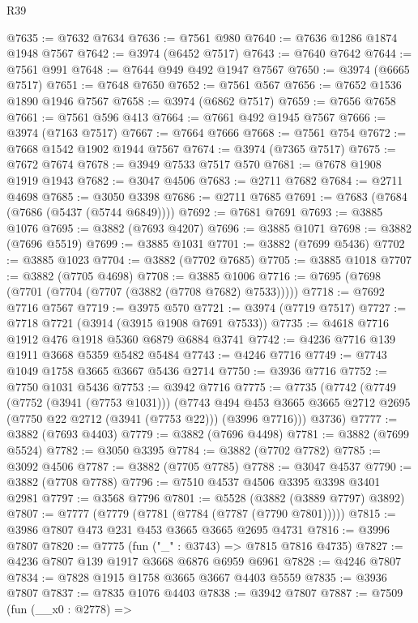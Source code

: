 \begin{lexlean}{R39}
\begin{coremodule}
@7635 := @7632 @7634
@7636 := @7561 @980
@7640 := @7636 @1286 @1874 @1948 @7567
@7642 := @3974 (@6452 @7517)
@7643 := @7640 @7642
@7644 := @7561 @991
@7648 := @7644 @949 @492 @1947 @7567
@7650 := @3974 (@6665 @7517)
@7651 := @7648 @7650
@7652 := @7561 @567
@7656 := @7652 @1536 @1890 @1946 @7567
@7658 := @3974 (@6862 @7517)
@7659 := @7656 @7658
@7661 := @7561 @596 @413
@7664 := @7661 @492 @1945 @7567
@7666 := @3974 (@7163 @7517)
@7667 := @7664 @7666
@7668 := @7561 @754
@7672 := @7668 @1542 @1902 @1944 @7567
@7674 := @3974 (@7365 @7517)
@7675 := @7672 @7674
@7678 := @3949 @7533 @7517 @570
@7681 := @7678 @1908 @1919 @1943
@7682 := @3047 @4506
@7683 := @2711 @7682
@7684 := @2711 @4698
@7685 := @3050 @3398
@7686 := @2711 @7685
@7691 := @7683 (@7684 (@7686 (@5437 (@5744 @6849))))
@7692 := @7681 @7691
@7693 := @3885 @1076
@7695 := @3882 (@7693 @4207)
@7696 := @3885 @1071
@7698 := @3882 (@7696 @5519)
@7699 := @3885 @1031
@7701 := @3882 (@7699 @5436)
@7702 := @3885 @1023
@7704 := @3882 (@7702 @7685)
@7705 := @3885 @1018
@7707 := @3882 (@7705 @4698)
@7708 := @3885 @1006
@7716 := @7695 (@7698 (@7701 (@7704 (@7707 (@3882 (@7708 @7682) @7533)))))
@7718 := @7692 @7716 @7567
@7719 := @3975 @570
@7721 := @3974 (@7719 @7517)
@7727 := @7718 @7721 (@3914 (@3915 @1908 @7691 @7533))
@7735 := @4618 @7716 @1912 @476 @1918 @5360 @6879 @6884 @3741
@7742 := @4236 @7716 @139 @1911 @3668 @5359 @5482 @5484
@7743 := @4246 @7716
@7749 := @7743 @1049 @1758 @3665 @3667 @5436 @2714
@7750 := @3936 @7716
@7752 := @7750 @1031 @5436
@7753 := @3942 @7716
@7775 := @7735
    (@7742
      (@7749
        (@7752 (@3941 (@7753 @1031)))
        (@7743
          @494
          @453
          @3665
          @3665
          @2712
          @2695
          (@7750 @22 @2712 (@3941 (@7753 @22)))
          (@3996 @7716)))
      @3736)
@7777 := @3882 (@7693 @4403)
@7779 := @3882 (@7696 @4498)
@7781 := @3882 (@7699 @5524)
@7782 := @3050 @3395
@7784 := @3882 (@7702 @7782)
@7785 := @3092 @4506
@7787 := @3882 (@7705 @7785)
@7788 := @3047 @4537
@7790 := @3882 (@7708 @7788)
@7796 := @7510 @4537 @4506 @3395 @3398 @3401 @2981
@7797 := @3568 @7796
@7801 := @5528 (@3882 (@3889 @7797) @3892)
@7807 := @7777 (@7779 (@7781 (@7784 (@7787 (@7790 @7801)))))
@7815 := @3986 @7807 @473 @231 @453 @3665 @3665 @2695 @4731
@7816 := @3996 @7807
@7820 := @7775 (fun ("_" : @3743) => @7815 @7816 @4735)
@7827 := @4236 @7807 @139 @1917 @3668 @6876 @6959 @6961
@7828 := @4246 @7807
@7834 := @7828 @1915 @1758 @3665 @3667 @4403 @5559
@7835 := @3936 @7807
@7837 := @7835 @1076 @4403
@7838 := @3942 @7807
@7887 := @7509
    (fun (__x0 : @2778) =>

\end{coremodule}
\end{lexlean}
